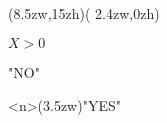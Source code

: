 \begin{nagarezu}(8.5zw,15zh)(%
    2.4zw,0zh)%
  \sitahe
  \begin{handan}{\strut$X>0$}%
    \begin{sitabunki}%
  	  \sitahe"NO"%
    \end{sitabunki}%
    \begin{migibunki}%
      \migihe<n>(3.5zw)"YES"
      \sitahe
      \sitahe
    \end{migibunki}%
  \end{handan}%
\end{nagarezu}%
